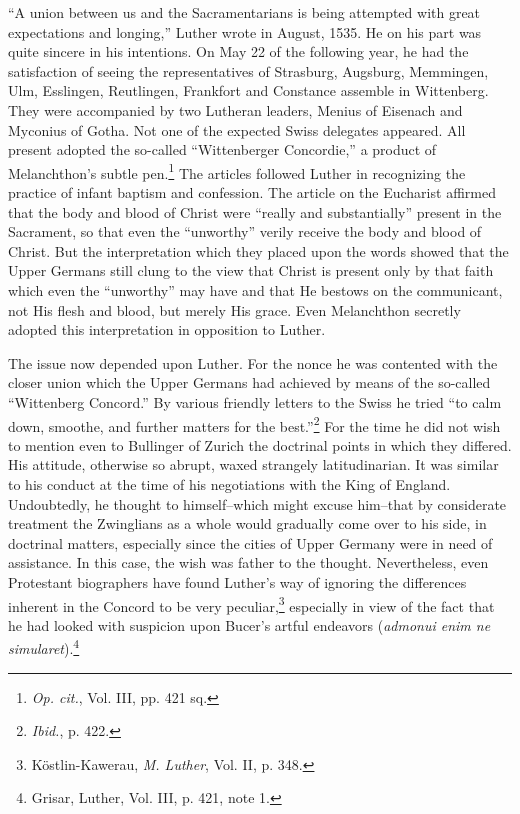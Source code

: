 “A union between us and the Sacramentarians is being attempted
with great expectations and longing,” Luther wrote in August, 1535.
He on his part was quite sincere in his intentions. On May 22 of the
following year, he had the satisfaction of seeing the representatives
of Strasburg, Augsburg, Memmingen, Ulm, Esslingen, Reutlingen,
Frankfort and Constance assemble in Wittenberg. They were accompanied
by two Lutheran leaders, Menius of Eisenach and Myconius
of Gotha. Not one of the expected Swiss delegates appeared. All
present adopted the so-called “Wittenberger Concordie,” a product
of Melanchthon’s subtle pen.\footnote{\textit{Op. cit.}, Vol. III, pp. 421 sq.}
 The articles followed Luther in
recognizing the practice of infant baptism and confession. The article
on the Eucharist affirmed that the body and blood of Christ were
“really and substantially” present in the Sacrament, so that even
the “unworthy” verily receive the body and blood of Christ. But
the interpretation which they placed upon the words showed that
the Upper Germans still clung to the view that Christ is present only
by that faith which even the “unworthy” may have and that He bestows
on the communicant, not His flesh and blood, but merely His
grace. Even Melanchthon secretly adopted this interpretation in opposition
to Luther.

The issue now depended upon Luther. For the nonce he was
contented with the closer union which the Upper Germans had
achieved by means of the so-called “Wittenberg Concord.” By
various friendly letters to the Swiss he tried “to calm down, smoothe,
and further matters for the best.”\footnote{\textit{Ibid.}, p. 422.}
 For the time he did not wish to
mention even to Bullinger of Zurich the doctrinal points in which
they differed. His attitude, otherwise so abrupt, waxed strangely
latitudinarian. It was similar to his conduct at the time of his
negotiations with the King of England. Undoubtedly, he thought
to himself--which might excuse him--that by considerate treatment the
Zwinglians as a whole would gradually come over to his
side, in doctrinal matters, especially since the cities of Upper Germany
were in need of assistance. In this case, the wish was father to
the thought. Nevertheless, even Protestant biographers have found
Luther’s way of ignoring the differences inherent in the Concord to
be very peculiar,\footnote{Köstlin-Kawerau, \textit{M. Luther}, Vol. II, p. 348.}
 especially in view of the fact that he had looked
with suspicion upon Bucer’s artful endeavors (\textit{admonui enim ne
simularet}).\footnote{Grisar, Luther, Vol. III, p. 421, note 1.}

